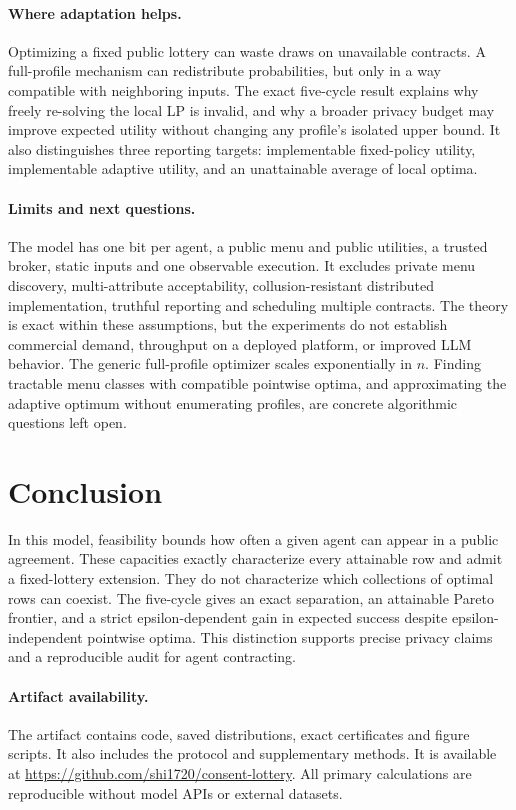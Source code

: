 \documentclass[sigconf,nonacm]{aamas}
\begin{document}
\paragraph{Where adaptation helps.}
Optimizing a fixed public lottery can waste draws on unavailable contracts. A full-profile mechanism can redistribute probabilities, but only in a way compatible with neighboring inputs. The exact five-cycle result explains why freely re-solving the local LP is invalid, and why a broader privacy budget may improve expected utility without changing any profile's isolated upper bound. It also distinguishes three reporting targets: implementable fixed-policy utility, implementable adaptive utility, and an unattainable average of local optima.

\paragraph{Limits and next questions.}
The model has one bit per agent, a public menu and public utilities, a trusted broker, static inputs and one observable execution. It excludes private menu discovery, multi-attribute acceptability, collusion-resistant distributed implementation, truthful reporting and scheduling multiple contracts. The theory is exact within these assumptions, but the experiments do not establish commercial demand, throughput on a deployed platform, or improved LLM behavior. The generic full-profile optimizer scales exponentially in $n$. Finding tractable menu classes with compatible pointwise optima, and approximating the adaptive optimum without enumerating profiles, are concrete algorithmic questions left open.

\section{Conclusion}
In this model, feasibility bounds how often a given agent can appear in a public agreement. These capacities exactly characterize every attainable row and admit a fixed-lottery extension. They do not characterize which collections of optimal rows can coexist. The five-cycle gives an exact separation, an attainable Pareto frontier, and a strict epsilon-dependent gain in expected success despite epsilon-independent pointwise optima. This distinction supports precise privacy claims and a reproducible audit for agent contracting.

\paragraph{Artifact availability.}
The artifact contains code, saved distributions, exact certificates and figure scripts. It also includes the protocol and supplementary methods. It is available at \url{https://github.com/shi1720/consent-lottery}. All primary calculations are reproducible without model APIs or external datasets.

\balance


\end{document}
